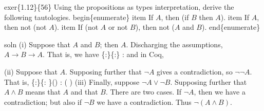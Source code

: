 \coqdocemptyline


exer\{1.12\}\{56\}  Using the propositions as types interpretation, derive the
following tautologies.
begin\{enumerate\}
  item If $A$, then (if $B$ then $A$).
  item If $A$, then not (not $A$).
  item If (not $A$ or not $B$), then not ($A$ and $B$).
end\{enumerate\}


soln (i)  Suppose that $A$ and $B$; then $A$.  Discharging the
assumptions, $A \to B \to A$.  That is, we
have 
  \{:\}\{:\} :     
and in Coq,


(ii)  Suppose that $A$.  Supposing further that $\lnot A$ gives a
contradiction, so $\lnot\lnot A$.  That is,
  \{:\}\{:  \}() :   (  )  
(iii)
Finally, suppose $\lnot A \lor \lnot B$.  Supposing further that $A \land B$
means that $A$ and that $B$.  There are two cases.  If $\lnot A$, then we have
a contradiction; but also if $\lnot B$ we have a contradiction.  Thus $\lnot (A
\land B)$.


